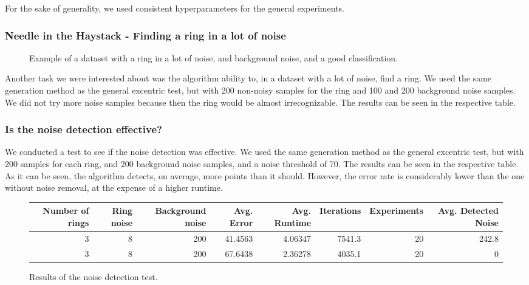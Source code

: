 \documentclass[conference]{IEEEtran}
\begin{document}
For the sake of generality, we used consistent hyperparameters for the general experiments.


\subsubsection{Needle in the Haystack - Finding a ring in a lot of noise}

\begin{figure}[H]
    \centering
    \resizebox{0.9\linewidth}{!}{}
    \label{fig:needle}
    \caption{Example of a dataset with a ring in a lot of noise, and background noise, and a good classification.}
\end{figure}

Another task we were interested about was the algorithm ability to, in a dataset with a lot of noise, find a ring. We used the same generation method as the general excentric test,
but with 200 non-noisy samples for the ring and 100 and 200 background noise samples. We did not try more noise samples because then the ring would be almost irrecognizable.
The results can be seen in the respective table.


\subsubsection{Is the noise detection effective?}
We conducted a test to see if the noise detection was effective. We used the same generation method as the general excentric test, but with 200 samples for each ring, and 200 background noise samples,
and a noise threshold of 70. The results can be seen in the respective table.
As it can be seen, the algorithm detects, on average, more points than it should. However, the error rate is considerably lower than the one without noise removal, at the expense of a higher runtime.


\begin{figure*}[!ht]
    \centering
    \begin{tabular}{rrrrrrrr}
    \hline
           Number of rings &   Ring noise &   Background noise &   Avg. Error &   Avg. Runtime &   Iterations &   Experiments &   Avg. Detected Noise \\
    \hline
                         3 &            8 &                200 &      41.4563 &        4.06347 &       7541.3 &            20 &                 242.8 \\
                         3 &            8 &                200 &      67.6438 &        2.36278 &       4035.1 &            20 &                   0   \\
    \hline
    \end{tabular}
    \caption{Results of the noise detection test.}
\end{figure*}
\end{document}
